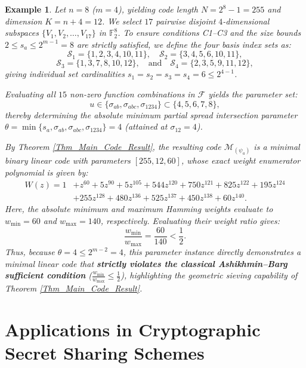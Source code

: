 \documentclass[pdflatex,sn-mathphys-num]{sn-jnl}%
\theoremstyle{thmstyleone}%
\theoremstyle{thmstyletwo}%
\newtheorem{example}{Example}%
\theoremstyle{thmstylethree}%
\begin{document}
\begin{example}\label{ex:AB_violated}
Let $n = 8$ ($m = 4$), yielding code length $N = 2^8 - 1 = 255$ and dimension $K = n + 4 = 12$. We select $17$ pairwise disjoint $4$-dimensional subspaces $\{V_1, V_2, \ldots, V_{17}\}$ in $\mathbb{F}_2^8$. To ensure conditions C1--C3 and the size bounds $2 \le s_a \le 2^{m-1} = 8$ are strictly satisfied, we define the four basis index sets as:
\[
\mathcal{S}_1 = \{1, 2, 3, 4, 10, 11\}, \quad \mathcal{S}_2 = \{3, 4, 5, 6, 10, 11\},
\]
\[
\mathcal{S}_3 = \{1, 3, 7, 8, 10, 12\}, \quad \text{and} \quad \mathcal{S}_4 = \{2, 3, 5, 9, 11, 12\},
\]
giving individual set cardinalities $s_1 = s_2 = s_3 = s_4 = 6 \le 2^{4-1}$.

Evaluating all $15$ non-zero function combinations in $\mathcal{F}$ yields the parameter set:
\[
u \in \{\sigma_{ab}, \sigma_{abc}, \sigma_{1234}\} \subset \{4, 5, 6, 7, 8\},
\]
thereby determining the absolute minimum partial spread intersection parameter $\theta = \min \{s_a, \sigma_{ab}, \sigma_{abc}, \sigma_{1234}\} = 4$ (attained at $\sigma_{12} = 4$).

By Theorem \ref{Thm_Main_Code_Result}, the resulting code $\mathcal{M}_{(\psi_a)}$ is a minimal binary linear code with parameters $[255, 12, 60]$, whose exact weight enumerator polynomial is given by:
\[
\begin{aligned}
W(z) = 1 &+ z^{60} + 5z^{90} + 5z^{105} + 544z^{120} + 750z^{121} + 825z^{122} + 195z^{124} \\
&+ 255z^{128} + 480z^{136} + 525z^{137} + 450z^{138} + 60z^{140}.
\end{aligned}
\]
Here, the absolute minimum and maximum Hamming weights evaluate to $w_{\min} = 60$ and $w_{\max} = 140$, respectively. Evaluating their weight ratio gives:
\[
\frac{w_{\min}}{w_{\max}} = \frac{60}{140}< \frac{1}{2}.
\]
Thus, because $\theta = 4 \le 2^{m-2} = 4$, this parameter instance directly demonstrates a minimal linear code that \textbf{strictly violates the classical Ashikhmin--Barg sufficient condition} ($\frac{w_{\min}}{w_{\max}} \le \frac{1}{2}$), highlighting the geometric sieving capability of Theorem \ref{Thm_Main_Code_Result}.
\end{example}







\section{Applications in Cryptographic Secret Sharing Schemes}
\end{document}
